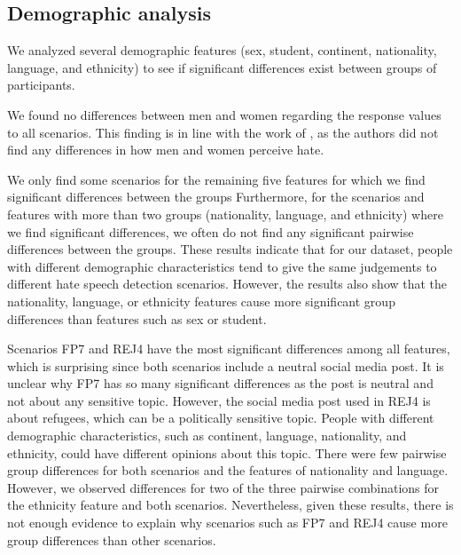 \subsection{Demographic analysis}
\label{sec:discussion-demographic}
We analyzed several demographic features (sex, student, continent, nationality, language, and ethnicity) to see if significant differences exist between groups of participants.
%

%
We found no differences between men and women regarding the response values to all scenarios.
%
This finding is in line with the work of \citet{gold2018women}, as the authors did not find any differences in how men and women perceive hate.
%

%
We only find some scenarios for the remaining five features for which we find significant differences between the groups
%
Furthermore, for the scenarios and features with more than two groups (nationality, language, and ethnicity) where we find significant differences, we often do not find any significant pairwise differences between the groups.
%
These results indicate that for our dataset, people with different demographic characteristics tend to give the same judgements to different hate speech detection scenarios.
%
However, the results also show that the nationality, language, or ethnicity features cause more significant group differences than features such as sex or student.
%


%
Scenarios FP7 and REJ4 have the most significant differences among all features, which is surprising since both scenarios include a neutral social media post.
%
It is unclear why FP7 has so many significant differences as the post is neutral and not about any sensitive topic.
%
However, the social media post used in REJ4 is about refugees, which can be a politically sensitive topic.
%
People with different demographic characteristics, such as continent, language, nationality, and ethnicity, could have different opinions about this topic.
%
There were few pairwise group differences for both scenarios and the features of nationality and language.
%
However, we observed differences for two of the three pairwise combinations for the ethnicity feature and both scenarios.
%
Nevertheless, given these results, there is not enough evidence to explain why scenarios such as FP7 and REJ4 cause more group differences than other scenarios.
%

